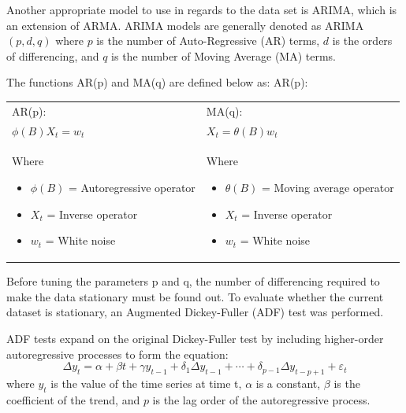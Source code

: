 \documentclass[12pt]{mcmthesis}
\begin{document}
    Another appropriate model to use in regards to the data set is ARIMA, which is an extension of ARMA. ARIMA models are generally denoted as ARIMA$(p, d, q)$ where
    $p$ is the number of Auto-Regressive (AR) terms,
    $d$ is the orders of differencing, and
    $q$ is the number of Moving Average (MA) terms.

    The functions AR(p) and MA(q) are defined below as:
    AR(p):

    \begin{tabular}{|*2{p{}|}}
        \hline
        AR(p):                       & MA(q):                   \\
        \quad ${\phi (B) X_t = w_t}$ & ${X_t = \theta (B) w_t}$ \\[\baselineskip]
        Where
        \begin{itemize}[nosep]
            \item ${\phi (B)}$ = Autoregressive operator
            \item ${X_t}$ = Inverse operator
            \item ${w_t}$ = White noise
        \end{itemize}
        &
        Where
        \begin{itemize}[nosep]
            \item ${\theta (B)}$ = Moving average operator
            \item ${X_t}$ = Inverse operator
            \item ${w_t}$ = White noise
        \end{itemize}
        \\
        \hline
    \end{tabular}

    Before tuning the parameters p and q, the number of differencing required to make the data stationary must be found out. To evaluate whether the current dataset is stationary, an Augmented Dickey-Fuller (ADF) test was performed.

    ADF tests expand on the original Dickey-Fuller test by including higher-order autoregressive processes to form the equation:
%
    \begin{equation}
        \Delta y_{t}=\alpha +\beta t+\gamma y_{t-1}+\delta _{1}\Delta y_{t-1}+\cdots +\delta _{p-1}\Delta y_{t-p+1}+\varepsilon _{t}
    \end{equation}
%
    where
    ${y_{t}}$ is the value of the time series at time t,
    ${\alpha}$ is a constant,
    ${\beta}$ is the coefficient of the trend, and
    $p$ is the lag order of the autoregressive process.
\end{document}
